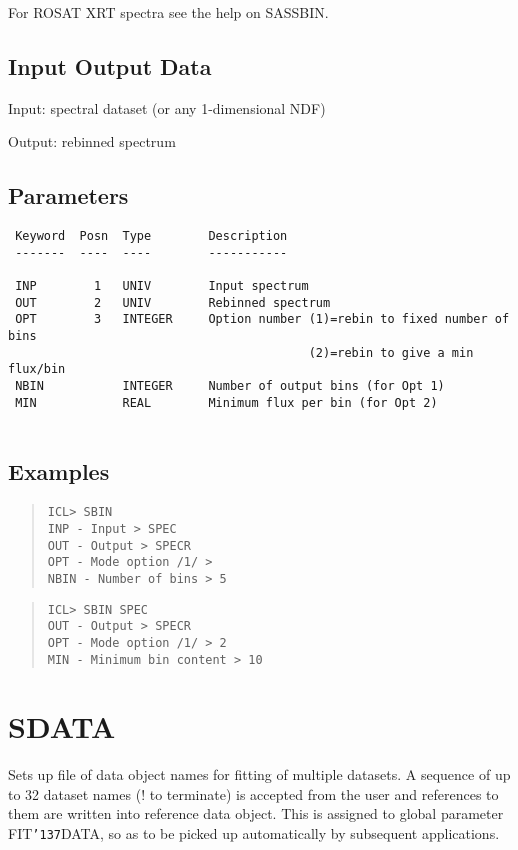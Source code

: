 \documentclass{book}
\renewcommand{\_}{{\tt\char'137}}     %
\begin{document}
For ROSAT XRT spectra see the help on SASSBIN.
 
\subsection{Input Output Data}
Input: spectral dataset (or any 1-dimensional NDF)
 
Output: rebinned spectrum
 
\subsection{Parameters}
\begin{verbatim}
 Keyword  Posn  Type        Description
 -------  ----  ----        -----------
 
 INP        1   UNIV        Input spectrum
 OUT        2   UNIV        Rebinned spectrum
 OPT        3   INTEGER     Option number (1)=rebin to fixed number of bins
                                          (2)=rebin to give a min flux/bin
 NBIN           INTEGER     Number of output bins (for Opt 1)
 MIN            REAL        Minimum flux per bin (for Opt 2)
 
\end{verbatim}\subsection{Examples}
\begin{quote}\begin{verbatim}
ICL> SBIN
INP - Input > SPEC
OUT - Output > SPECR
OPT - Mode option /1/ >
NBIN - Number of bins > 5
\end{verbatim}\end{quote}
\begin{quote}\begin{verbatim}
ICL> SBIN SPEC
OUT - Output > SPECR
OPT - Mode option /1/ > 2
MIN - Minimum bin content > 10
\end{verbatim}\end{quote}
\section{SDATA}
Sets up file of data object names for fitting of multiple
datasets. A sequence of up to 32 dataset names (! to terminate)
is accepted from the user and references to them are written into
reference data object. This is assigned to global parameter
FIT\_DATA, so as to be picked up automatically by subsequent
applications.
 
\end{document}

